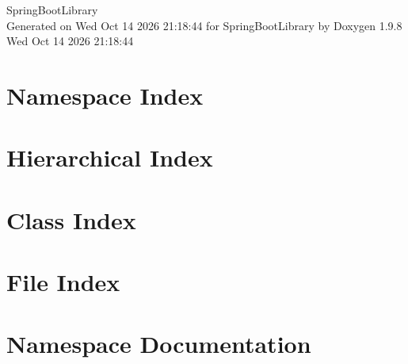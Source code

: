 \documentclass[twoside]{book}
\newcommand{\+}{\discretionary{\mbox{\scriptsize$\hookleftarrow$}}{}{}}
\newcommand{\clearemptydoublepage}{%
    \newpage{\pagestyle{empty}\cleardoublepage}%
  }
\begin{document}
  \raggedbottom
    \hypersetup{pageanchor=false,
                bookmarksnumbered=true,
                pdfencoding=unicode
               }
  \begin{titlepage}
  \vspace*{7cm}
  \begin{center}%
  {\Large Spring\+Boot\+Library}\\
  \vspace*{1cm}
  {\large Generated on Wed Oct 14 2026 21\+:18\+:44 for Spring\+Boot\+Library by Doxygen 1.9.8}\\
    \vspace*{0.5cm}
    {\small Wed Oct 14 2026 21:18:44}
  \end{center}
  \end{titlepage}
  \clearemptydoublepage
  \tableofcontents
  \clearemptydoublepage
  \hypersetup{pageanchor=true}
\chapter{Namespace Index}

\chapter{Hierarchical Index}

\chapter{Class Index}

\chapter{File Index}

\chapter{Namespace Documentation}








\end{document}
